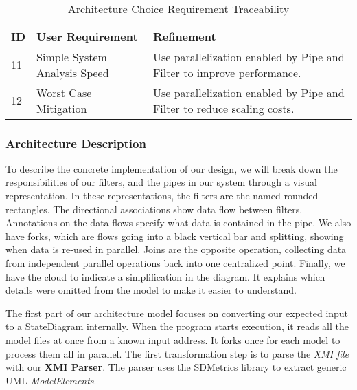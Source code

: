     \begin{table}[htbp]
        \centering
        \caption{Architecture Choice Requirement Traceability}\label{tab:arch-choice-table}\\
        \begin{tabularx}{\textwidth}{| l | l | X |}
            \hline
            \textbf{ID} & \textbf{User Requirement} & \textbf{Refinement} \\
            \hline
            11 & Simple System Analysis Speed & Use parallelization enabled by Pipe and Filter to improve performance. \\ \hline
            12 & Worst Case Mitigation & Use parallelization enabled by Pipe and Filter to reduce scaling costs.  \\ \hline
        \end{tabularx}
    \end{table}

    \newpage
    \subsubsection{Architecture Description}\label{subsubsec:arch-desc}
    To describe the concrete implementation of our design,
    we will break down the responsibilities of our filters, and the pipes in our system through a visual representation.
    In these representations, the filters are the named rounded rectangles.
    The directional associations show data flow between filters.
    Annotations on the data flows specify what data is contained in the pipe.
    We also have forks, which are flows going into a black vertical bar and splitting, showing when data is re-used in parallel.
    Joins are the opposite operation, collecting data from independent parallel operations back into one centralized point.
    Finally, we have the cloud to indicate a simplification in the diagram.
    It explains which details were omitted from the model to make it easier to understand.

    The first part of our architecture model focuses on converting our expected input to a StateDiagram internally.
    When the program starts execution, it reads all the model files at once from a known input address.
    It forks once for each model to process them all in parallel.
    The first transformation step is to parse the \textit{XMI file} with our \textbf{XMI Parser}.
    The parser uses the SDMetrics library to extract generic UML \textit{ModelElements}.

